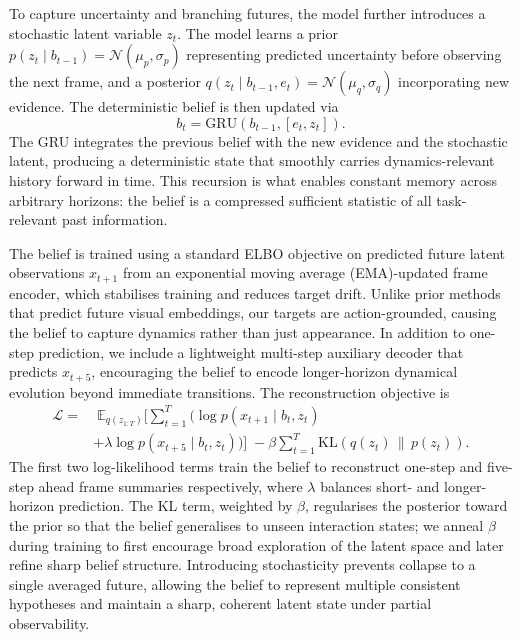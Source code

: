 \documentclass[12pt]{article}
\begin{document}
To capture uncertainty and branching futures, the model further introduces a stochastic latent variable $z_t$. The model learns a prior $p(z_t \mid b_{t-1}) = \mathcal{N}(\mu_p, \sigma_p)$ representing predicted uncertainty before observing the next frame, and a posterior $q(z_t \mid b_{t-1}, e_t) = \mathcal{N}(\mu_q, \sigma_q)$ incorporating new evidence. The deterministic belief is then updated via
\begin{equation}
b_t = \mathrm{GRU}\!\left(b_{t-1}, [e_t, z_t]\right) .
\end{equation}
The GRU integrates the previous belief with the new evidence and the stochastic latent, producing a deterministic state that smoothly carries dynamics-relevant history forward in time. This recursion is what enables constant memory across arbitrary horizons: the belief is a compressed sufficient statistic of all task-relevant past information.

The belief is trained using a standard ELBO objective on predicted future latent observations $x_{t+1}$ from an exponential moving average (EMA)-updated frame encoder, which stabilises training and reduces target drift. Unlike prior methods \cite{chen2025vl} that predict future visual embeddings, our targets are action-grounded, causing the belief to capture dynamics rather than just appearance. In addition to one-step prediction, we include a lightweight multi-step auxiliary decoder that predicts $x_{t+5}$, encouraging the belief to encode longer-horizon dynamical evolution beyond immediate transitions. The reconstruction objective is
\begin{equation}
\begin{aligned}
\mathcal{L}
=&\;
\mathbb{E}_{q(z_{1:T})}
\Bigg[
\sum_{t=1}^{T}
\Big(
\log p(x_{t+1} \mid b_t, z_t)  \\
&
+ \lambda \log p(x_{t+5} \mid b_t,z_t)
\Big)
\Bigg]
\;-
\beta
\sum_{t=1}^{T}
\mathrm{KL}\!\left(q(z_t) \,\|\, p(z_t)\right) .
\end{aligned}
\end{equation}
The first two log-likelihood terms train the belief to reconstruct one-step and five-step ahead frame summaries respectively, where $\lambda$ balances short- and longer-horizon prediction. The KL term, weighted by $\beta$, regularises the posterior toward the prior so that the belief generalises to unseen interaction states; we anneal $\beta$ during training to first encourage broad exploration of the latent space and later refine sharp belief structure. Introducing stochasticity prevents collapse to a single averaged future, allowing the belief to represent multiple consistent hypotheses and maintain a sharp, coherent latent state under partial observability.
\end{document}
